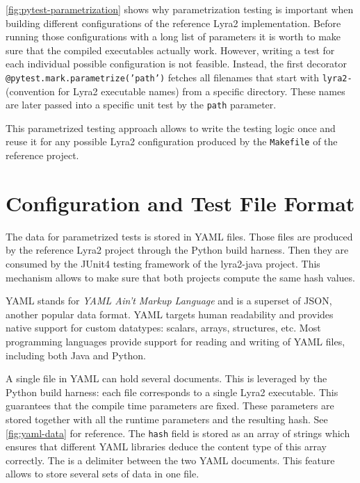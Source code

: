 \autoref{fig:pytest-parametrization} shows why parametrization testing is important when building different configurations of the reference Lyra2 implementation. Before running those configurations with a long list of parameters it is worth to make sure that the compiled executables actually work. However, writing a test for each individual possible configuration is not feasible. Instead, the first decorator \texttt{@pytest.mark.parametrize('path')} fetches all filenames that start with \texttt{lyra2-} (convention for Lyra2 executable names) from a specific directory. These names are later passed into a specific unit test by the \texttt{path} parameter.

This parametrized testing approach allows to write the testing logic once and reuse it for any possible Lyra2 configuration produced by the \texttt{Makefile} of the reference project.

\section{Configuration and Test File Format}
\label{sec:configuration-and-test-file-format}

The data for parametrized tests is stored in YAML files. Those files are produced by the reference Lyra2 project through the Python build harness. Then they are consumed by the JUnit4 testing framework of the lyra2-java project. This mechanism allows to make sure that both projects compute the same hash values.

YAML stands for \emph{YAML Ain't Markup Language} and is a superset of JSON, another popular data format. YAML targets human readability and provides native support for custom datatypes: scalars, arrays, structures, etc. Most programming languages provide support for reading and writing of YAML files, including both Java and Python.

A single file in YAML can hold several documents. This is leveraged by the Python build harness: each file corresponds to a single Lyra2 executable. This guarantees that the compile time parameters are fixed. These parameters are stored together with all the runtime parameters and the resulting hash. See \autoref{fig:yaml-data} for reference. The \texttt{hash} field is stored as an array of strings which ensures that different YAML libraries deduce the content type of this array correctly. The \texttt{\-\-\-} is a delimiter between the two YAML documents. This feature allows to store several sets of data in one file.

